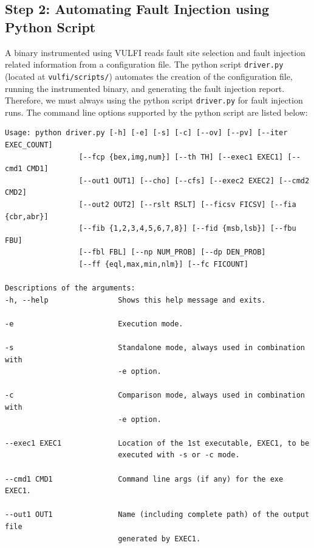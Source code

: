 \documentclass[12pt,a4paper]{article}
\begin{document}
\subsection{Step 2: Automating Fault Injection using Python Script}
\label{cmdopt}

A binary instrumented using VULFI reads fault site selection and 
fault injection related information from a configuration file.
%
The python script \texttt{driver.py} (located at \texttt{vulfi/scripts/})
automates the creation of the configuration file, running the instrumented
binary, and generating the fault injection report.
%
Therefore, we must always using the python script \texttt{driver.py} for 
fault injection runs.
%
The command line options supported by the python script are listed
below:

 \begin{Verbatim}[fontsize=\relsize{-1},frame=single,framerule=0.1mm,commandchars=\\\{\}]
Usage: python driver.py [-h] [-e] [-s] [-c] [--ov] [--pv] [--iter EXEC_COUNT]
                 [--fcp {bex,img,num}] [--th TH] [--exec1 EXEC1] [--cmd1 CMD1]
                 [--out1 OUT1] [--cho] [--cfs] [--exec2 EXEC2] [--cmd2 CMD2]
                 [--out2 OUT2] [--rslt RSLT] [--ficsv FICSV] [--fia {cbr,abr}]
                 [--fib {1,2,3,4,5,6,7,8}] [--fid {msb,lsb}] [--fbu FBU]
                 [--fbl FBL] [--np NUM_PROB] [--dp DEN_PROB]
                 [--ff {eql,max,min,nlm}] [--fc FICOUNT]

Descriptions of the arguments:
-h, --help                Shows this help message and exits.

-e                        Execution mode.

-s                        Standalone mode, always used in combination with 
                          -e option.
                                     
-c                        Comparison mode, always used in combination with 
                          -e option.

--exec1 EXEC1             Location of the 1st executable, EXEC1, to be 
                          executed with -s or -c mode.
                           
--cmd1 CMD1               Command line args (if any) for the exe EXEC1.
                          
--out1 OUT1               Name (including complete path) of the output file 
                          generated by EXEC1.                    


\end{Verbatim}
\end{document}
